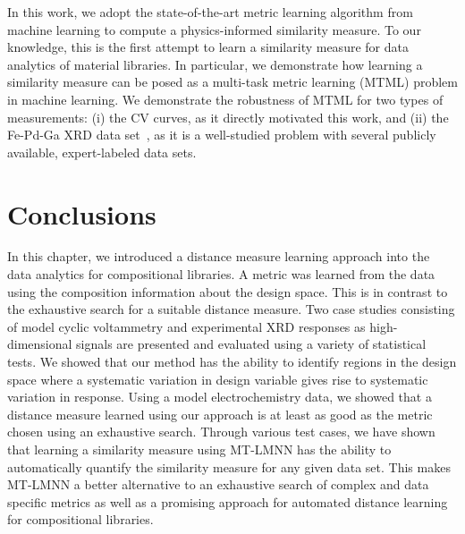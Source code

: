 \par In this work, we adopt the state-of-the-art metric learning algorithm from machine learning to compute a physics-informed similarity measure. To our knowledge, this is the first attempt to learn a similarity measure for data analytics of material libraries. In particular, we demonstrate how learning a similarity measure can be posed as a multi-task metric learning (MTML) problem in machine learning.
We demonstrate the robustness of MTML for two types of measurements:
(i) the CV curves, as it directly motivated this work, and 
(ii) the Fe-Pd-Ga XRD data set~\cite{long2007rapid}, as it is a well-studied problem with several publicly available, expert-labeled data sets. 



\section{Conclusions}
In this chapter, we introduced a distance measure learning approach into the data analytics for compositional libraries. 
A metric was learned from the data using the composition information about the design space. 
This is in contrast to the exhaustive search for a suitable distance measure.
Two case studies consisting of model cyclic voltammetry and experimental XRD responses as high-dimensional signals are presented and evaluated using a variety of statistical tests.
We showed that our method has the ability to identify regions in the design space where a systematic variation in design variable gives rise to systematic variation in response. 
Using a model electrochemistry data, we showed that a distance measure learned using our approach is at least as good as the metric chosen using an exhaustive search.
Through various test cases, we have shown that learning a similarity measure using MT-LMNN has the ability to automatically quantify the similarity measure for any given data set. This makes MT-LMNN a better alternative to an exhaustive search of complex and data specific metrics as well as a promising approach for automated distance learning for compositional libraries. 
